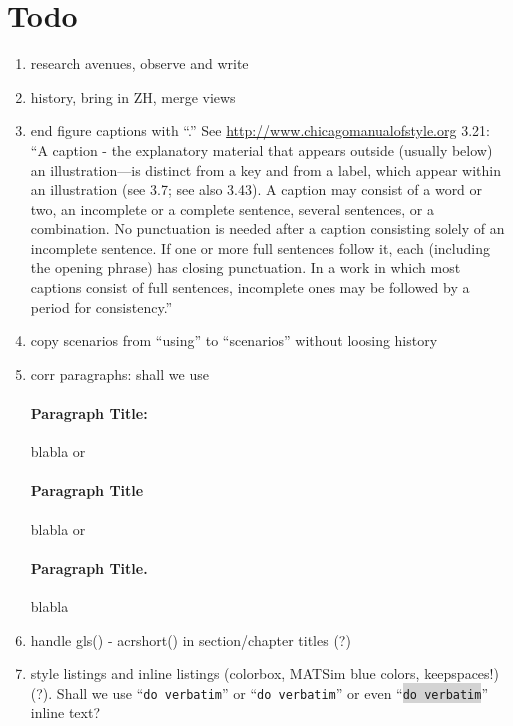 \section*{Todo}

\begin{enumerate}\styleEnumerate

\item research avenues, observe and write

\item history, bring in ZH, merge views

\item end figure captions with ``.'' See \url{http://www.chicagomanualofstyle.org} 3.21: ``A caption - the explanatory material that appears outside (usually below) an illustration—is distinct from a key and from a label, which appear within an illustration (see 3.7; see also 3.43). A caption may consist of a word or two, an incomplete or a complete sentence, several sentences, or a combination. No punctuation is needed after a caption consisting solely of an incomplete sentence. If one or more full sentences follow it, each (including the opening phrase) has closing punctuation. In a work in which most captions consist of full sentences, incomplete ones may be followed by a period for consistency.''

\item copy scenarios from ``using'' to ``scenarios'' without loosing history

\item corr paragraphs: shall we use \paragraph{Paragraph Title:} blabla or \paragraph{Paragraph Title} blabla or \paragraph{Paragraph Title.} blabla

\item handle gls() - acrshort() in section/chapter titles (?)

\item style listings and inline listings (colorbox, MATSim blue colors, keepspaces!) (?). Shall we use ``\verb|do verbatim|'' or ``\lstinline|do verbatim|'' or even ``\colorbox{lightgray}{\lstinline|do verbatim|}'' inline text?


\end{enumerate}
